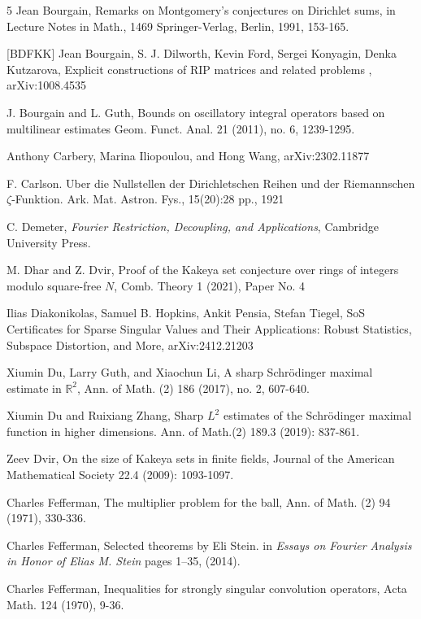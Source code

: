 \documentclass{amsart}
\newcommand{\RR}{\mathbb{R}}
\begin{document}
\begin{thebibliography}{5}
 Jean Bourgain, Remarks on Montgomery's conjectures on Dirichlet sums, 
in Lecture Notes in Math., 1469
Springer-Verlag, Berlin, 1991, 153-165.

[BDFKK]  Jean Bourgain, S. J. Dilworth, Kevin Ford, Sergei Konyagin, Denka Kutzarova, Explicit constructions of RIP matrices and related problems , arXiv:1008.4535 

 J. Bourgain and L. Guth,  Bounds on oscillatory integral operators based on multilinear estimates
Geom. Funct. Anal. 21 (2011), no. 6, 1239-1295.

 Anthony Carbery, Marina Iliopoulou, and Hong Wang,   	arXiv:2302.11877

 F. Carlson. Uber die Nullstellen der Dirichletschen Reihen und der Riemannschen $\zeta$-Funktion. Ark. Mat.
Astron. Fys., 15(20):28 pp., 1921

 C. Demeter, {\it Fourier Restriction, Decoupling, and Applications}, Cambridge University Press.

 M. Dhar and Z. Dvir, Proof of the Kakeya set conjecture over rings of integers modulo square-free $N$,  Comb. Theory 1 (2021), Paper No. 4

  Ilias Diakonikolas, Samuel B. Hopkins, Ankit Pensia, Stefan Tiegel,  SoS Certificates for Sparse Singular Values and Their Applications: Robust Statistics, Subspace Distortion, and More, arXiv:2412.21203 

 Xiumin Du, Larry Guth, and Xiaochun Li, A sharp Schrödinger maximal estimate in $\RR^2$, 
Ann. of Math. (2) 186 (2017), no. 2, 607-640.

 Xiumin Du and Ruixiang Zhang,  Sharp $L^2$ estimates of the Schrödinger maximal function in higher dimensions. Ann. of Math.(2) 189.3 (2019): 837-861.

 Zeev Dvir,  On the size of Kakeya sets in finite fields,  Journal of the American Mathematical Society 22.4 (2009): 1093-1097.

 Charles Fefferman,  The multiplier problem for the ball, Ann. of Math. (2) 94 (1971), 330-336.

 Charles Fefferman,  Selected theorems by Eli Stein. in {\it  Essays on Fourier Analysis in Honor of Elias M. Stein }  pages 1–35, (2014).

 Charles Fefferman,   Inequalities for strongly singular convolution operators, 
Acta Math.  124 (1970), 9-36.


\end{thebibliography}
\end{document}
